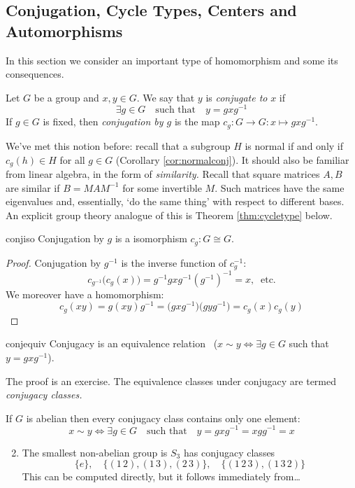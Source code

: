 \clearpage




\subsection{Conjugation, Cycle Types, Centers and Automorphisms}\label{sec:conj}

In this section we consider an important type of homomorphism and some its consequences.

\begin{defn}{}{}
Let $G$ be a group and $x,y\in G$. We say that $y$ is \emph{conjugate to} $x$ if
\[\exists g\in G\quad\text{such that}\quad y=gx g^{-1}\]
If $g\in G$ is fixed, then \emph{conjugation by $g$} is the map $c_g:G\to G:x\mapsto gx g^{-1}$.
\end{defn}

We've met this notion before: recall that a subgroup $H$ is normal if and only if $c_g(h)\in H$ for all $g\in G$ (Corollary \ref{cor:normalconj}). It should also be familiar from linear algebra, in the form of \emph{similarity.} Recall that square matrices $A,B$ are similar if $B=MAM^{-1}$ for some invertible $M$. Such matrices have the same eigenvalues and, essentially, `do the same thing' with respect to different bases. An explicit group theory analogue of this is Theorem \ref{thm:cycletype} below.


\begin{lemm}{}{conjiso}
Conjugation by $g$ is a isomorphism $c_g:G\cong G$.
\end{lemm}

\begin{proof}
Conjugation by $g^{-1}$ is the inverse function of $c_g^{-1}$:
\[c_{g^{-1}}\bigl(c_g(x)\bigr)=g^{-1}gx g^{-1}(g^{-1})^{-1}=x,\ \text{ etc.}\]
We moreover have a homomorphism:
\[c_g(xy)=g(xy)g^{-1}=\bigl(gx g^{-1}\bigr)\bigl(gy g^{-1}\bigr)=c_g(x)c_g(y)\tag*{\qedhere}\]
\end{proof}


\begin{lemm}{}{conjequiv}
Conjugacy is an equivalence relation \ ($x\sim y\iff \exists g\in G$ such that $y=gx g^{-1}$).
\end{lemm}

The proof is an exercise. The equivalence classes under conjugacy are termed \emph{conjugacy classes.}


\begin{examples}{}{}
\exstart If $G$ is abelian then every conjugacy class contains only one element:
\[x\sim y\iff \exists g\in G\quad\text{such that}\quad y=gxg^{-1}=xgg^{-1}=x\]
\begin{enumerate}\setcounter{enumi}{1}
	\item The smallest non-abelian group is $S_3$ has conjugacy classes
	\[\{e\},\quad \{(1\,2),(1\,3),(2\,3)\},\quad \{(1\,2\,3),(1\,3\,2)\}\]
	This can be computed directly, but it follows immediately from\ldots
\end{enumerate}
\end{examples}

